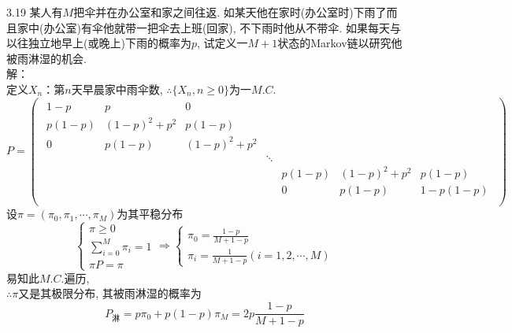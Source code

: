 3.19 某人有$M$把伞并在办公室和家之间往返. 如某天他在家时(办公室时)下雨了而且家中(办公室)有伞他就带一把伞去上班(回家), 不下雨时他从不带伞. 如果每天与以往独立地早上(或晚上)下雨的概率为$p$, 试定义一$M+1$状态的Markov链以研究他被雨淋湿的机会.\\
解：\\
定义$X_n$：第$n$天早晨家中雨伞数, $\therefore \{X_n, n \geqslant 0\}$为一$M.C.$\\
	\[
	P = 
	\begin{pmatrix}
	\begin{smallmatrix}
		1-p & p & 0 & ~ & ~ & ~ & ~\\
		p(1-p) & (1-p)^2+p^2 & p(1-p) & ~ & ~ & ~ & ~\\
		0 & p(1-p) & (1-p)^2+p^2 & ~ & ~ & ~ & ~\\
		~ & ~ & ~ & \ddots & ~ & ~ & ~\\
		~ & ~ & ~ & ~ & p(1-p) & (1-p)^2+p^2 & p(1-p)\\
		~ & ~ & ~ & ~ & 0 & p(1-p) & 1-p(1-p)\\
	\end{smallmatrix}
	\end{pmatrix}
	\]
	设$\pi = (\pi_0, \pi_1, \cdots, \pi_M)$为其平稳分布\\
	\[
	\begin{cases}
	\pi \geqslant 0\\
	\sum\limits^M_{i=0}\pi_i = 1\\
	\pi P = \pi
	\end{cases}
	\Rightarrow
	\begin{cases}
	\pi_0 = \frac{1-p}{M+1-p}\\
	\pi_i = \frac{1}{M+1-p} (i = 1,2,\cdots,M)
	\end{cases}
	\]
易知此$M.C.$遍历, \\
$\therefore \pi$又是其极限分布, 其被雨淋湿的概率为
\[
P_{\text{淋}} = p\pi_0+p(1-p)\pi_M = 2p\frac{1-p}{M+1-p}
\]


